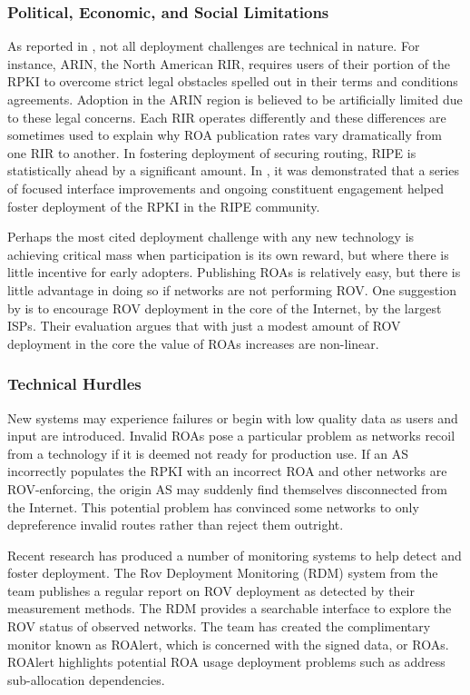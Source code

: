 \documentclass[sigconf]{acmart}
\begin{document}
\subsubsection{Political, Economic, and Social Limitations}

As reported in \cite{yoo_lowering_2018}, not all deployment challenges
are technical in nature.  For instance, ARIN, the North American RIR,
requires users of their portion of the RPKI to overcome strict legal
obstacles spelled out in their terms and conditions agreements.
Adoption in the ARIN region is believed to be artificially limited due to
these legal concerns.  Each RIR operates differently and these
differences are sometimes used to explain why ROA publication rates vary
dramatically from one RIR to another.  In fostering deployment of
securing routing, RIPE is statistically ahead by a significant amount.
In \cite{alex_band_ripe_2015}, it was demonstrated that a series of
focused interface improvements and ongoing constituent engagement helped
foster deployment of the RPKI in the RIPE community.

Perhaps the most cited deployment challenge with any new technology is
achieving critical mass when participation is its own reward, but where
there is little incentive for early adopters.  Publishing ROAs is
relatively easy, but there is little advantage in doing so if networks
are not performing ROV.  One suggestion by \cite{gilad_are_2017} is to
encourage ROV deployment in the core of the Internet, by the largest
ISPs.  Their evaluation argues that with just a modest amount of ROV
deployment in the core the value of ROAs increases are non-linear.

\subsubsection{Technical Hurdles}

New systems may experience failures or begin with low quality data as
users and input are introduced.  Invalid ROAs pose a particular problem
as networks recoil from a technology if it is deemed not ready for
production use.  If an AS incorrectly populates the RPKI with an
incorrect ROA and other networks are ROV-enforcing, the origin AS may
suddenly find themselves disconnected from the Internet.  This potential
problem has convinced some networks to only depreference invalid routes
rather than reject them outright.

Recent research has produced a number of monitoring systems to help
detect and foster deployment.  The Rov Deployment Monitoring (RDM)
system from the \cite{reuter_towards_2018} team publishes a regular
report on ROV deployment as detected by their measurement methods.  The
RDM provides a searchable interface to explore the ROV status of
observed networks.  The \cite{gilad_are_2017} team has created the
complimentary monitor known as ROAlert, which is concerned with the
signed data, or ROAs.  ROAlert highlights potential ROA usage deployment
problems such as address sub-allocation dependencies.
\end{document}
